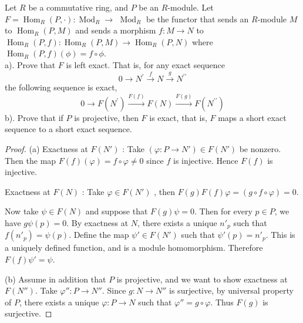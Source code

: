 
\begin{problem}
	Let $R$ be a commutative ring, and $P$ be an $R$-module. Let $F=\operatorname{Hom}_R(P, \cdot): \operatorname{Mod}_R \rightarrow$ $\operatorname{Mod}_R$ be the functor that sends an $R$-module $M$ to $\operatorname{Hom}_R(P, M)$ and sends a morphism $f: M \rightarrow N$ to $\operatorname{Hom}_R(P, f): \operatorname{Hom}_R(P, M) \rightarrow \operatorname{Hom}_R(P, N)$ where $\operatorname{Hom}_R(P, f)(\phi)=f \circ \phi$.\\
a). Prove that $F$ is left exact. That is, for any exact sequence
\[
0 \longrightarrow N^{\prime} \xrightarrow{f} N \xrightarrow{g} N^{\prime \prime}
\]
the following sequence is exact,
\[
0 \longrightarrow F\left(N^{\prime}\right) \xrightarrow{F(f)} F(N) \xrightarrow{F(g)} F\left(N^{\prime \prime}\right)
\]
b). Prove that if $P$ is projective, then $F$ is exact, that is, $F$ maps a short exact sequence to a short exact sequence.
\end{problem}
\begin{proof}
	(a) Exactness at  $F(N')$ : Take $(\varphi: P \to N') \in F(N')$ be nonzero. Then the map $F(f)(\varphi) = f \circ \varphi \neq 0$ since $f$ is injective. Hence $F(f)$ is injective.

	Exactness at $F(N)$ : Take $\varphi \in F(N')$ , then $F(g) F(f) \varphi = (g \circ f \circ \varphi) = 0$. 

	Now take $\psi \in F(N)$ and suppose that $F(g) \psi = 0$. Then for every $p \in P$, we have $g \psi(p) = 0$. By exactness at $N$, there exists a unique $n'_p$ such that $f(n'_p) = \psi(p)$. Define the map $\psi' \in F(N')$ such that $\psi'(p) = n'_p$. This is a uniquely defined function, and is a module homomorphism. Therefore $F(f) \psi' = \psi$.

	(b) Assume in addition that $P$ is projective, and we want to show exactness at $F(N'')$. Take $\varphi'': P \to N''$. Since $g: N \to N''$ is surjective, by universal property of $P$, there exists a unique $\varphi : P \to N$ such that $\varphi'' = g \circ \varphi$. Thus $F(g)$ is surjective.
\end{proof}



